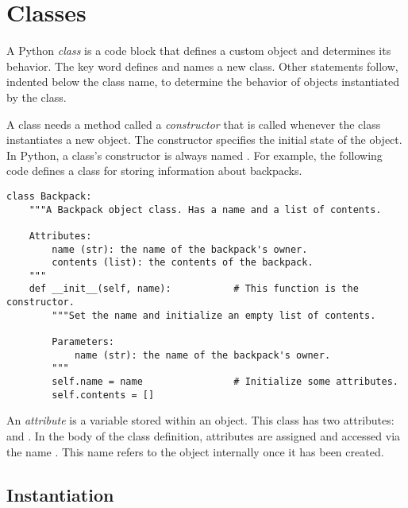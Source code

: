 \label{lab:OOP}

\section*{Classes} %

A Python \emph{class} is a code block that defines a custom object and determines its behavior.
The  key word defines and names a new class.
Other statements follow, indented below the class name, to determine the behavior of objects instantiated by the class.

A class needs a method called a \emph{constructor} that is called whenever the class instantiates a new object.
The constructor specifies the initial state of the object.
In Python, a class's constructor is always named .
For example, the following code defines a class for storing information about backpacks.

\begin{lstlisting}
class Backpack:
    """A Backpack object class. Has a name and a list of contents.

    Attributes:
        name (str): the name of the backpack's owner.
        contents (list): the contents of the backpack.
    """
    def __init__(self, name):           # This function is the constructor.
        """Set the name and initialize an empty list of contents.

        Parameters:
            name (str): the name of the backpack's owner.
        """
        self.name = name                # Initialize some attributes.
        self.contents = []
\end{lstlisting}

An \emph{attribute} is a variable stored within an object.
This  class has two attributes:  and .
In the body of the class definition, attributes are assigned and accessed via the name .
This name refers to the object internally once it has been created.

\subsection*{Instantiation} %


